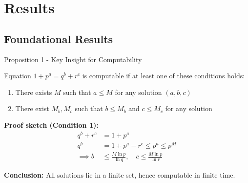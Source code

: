 \section{Results}

\subsection{Foundational Results}

\begin{frame}{Proposition 1 - Key Insight for Computability}
    \begin{proposition}
       Equation $1+p^a = q^b + r^c$ is computable if at least one of these conditions holds:
       \begin{enumerate}
           \item There exists $M$ such that $a \leq M$ for any solution $(a,b,c)$
           \item There exist $M_b, M_c$ such that $b \leq M_b$ and $c \leq M_c$ for any solution
       \end{enumerate}
    \end{proposition}
    
    \textbf{Proof sketch (Condition 1):}
    \begin{align*}
        q^b+r^c &= 1+p^a \\
        q^b &= 1+p^a - r^c \leq p^a \leq p^M \\
        \implies b &\leq \frac{M\ln p}{\ln q},\quad c \leq \frac{M\ln p}{\ln r}
    \end{align*}
    
    \textbf{Conclusion:} All solutions lie in a finite set, hence computable in finite time.
\end{frame}
